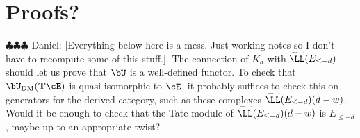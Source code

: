 \documentclass[12pt]{amsart}
\theoremstyle{definition}
\theoremstyle{remark}
\newcommand{\Tate}{{\mathbf{T}}}
\newcommand{\cO}{{\mathcal O}}
\newcommand{\daniel}[1]{{\color{blue} \sf $\clubsuit\clubsuit\clubsuit$ Daniel: [#1]}}
\def\DM{\operatorname{DM}}
\begin{document}
%
%
\section{Proofs?}
\daniel{Everything below here is a mess.  Just working notes so I don't have to recompute some of this stuff.}. The connection of $K_d$ with $\widetilde{\LL}(E_{\leq -d})$ should let us prove that $\bU$ is a well-defined functor. To check that $\bU_{\DM}(\Tate\cE)$ is quasi-isomorphic to $\cE$, it probably suffices to check this on generators for the derived category, such as these complexes $\widetilde{\LL}(E_{\leq -d})(d-w)$.   Would it be enough to check that the Tate module of $\widetilde{\LL}(E_{\leq -d})(d-w)$ is $E_{\leq -d}$, maybe up to an appropriate twist?

%
\end{document}
